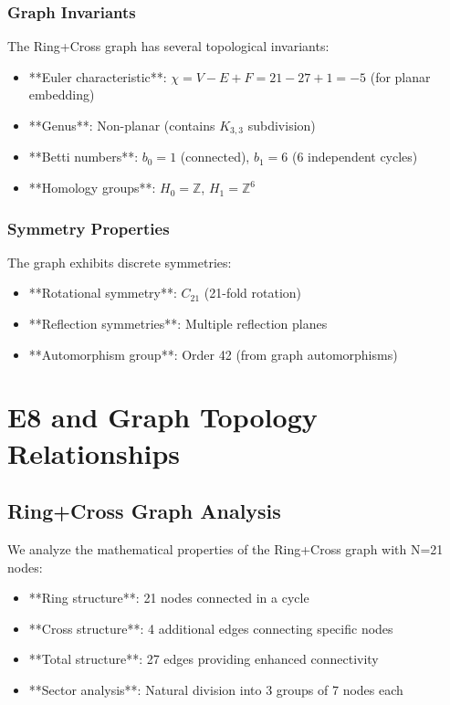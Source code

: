 \documentclass[12pt,a4paper]{article}
\begin{document}
\subsubsection{Graph Invariants}
The Ring+Cross graph has several topological invariants:

\begin{itemize}
\item **Euler characteristic**: $\chi = V - E + F = 21 - 27 + 1 = -5$ (for planar embedding)
\item **Genus**: Non-planar (contains $K_{3,3}$ subdivision)
\item **Betti numbers**: $b_0 = 1$ (connected), $b_1 = 6$ (6 independent cycles)
\item **Homology groups**: $H_0 = \mathbb{Z}$, $H_1 = \mathbb{Z}^6$
\end{itemize}

\subsubsection{Symmetry Properties}
The graph exhibits discrete symmetries:

\begin{itemize}
\item **Rotational symmetry**: $C_{21}$ (21-fold rotation)
\item **Reflection symmetries**: Multiple reflection planes
\item **Automorphism group**: Order 42 (from graph automorphisms)
\end{itemize}

\section{E8 and Graph Topology Relationships}

\subsection{Ring+Cross Graph Analysis}

We analyze the mathematical properties of the Ring+Cross graph with N=21 nodes:

\begin{itemize}
\item **Ring structure**: 21 nodes connected in a cycle
\item **Cross structure**: 4 additional edges connecting specific nodes
\item **Total structure**: 27 edges providing enhanced connectivity
\item **Sector analysis**: Natural division into 3 groups of 7 nodes each
\end{itemize}
\end{document}
